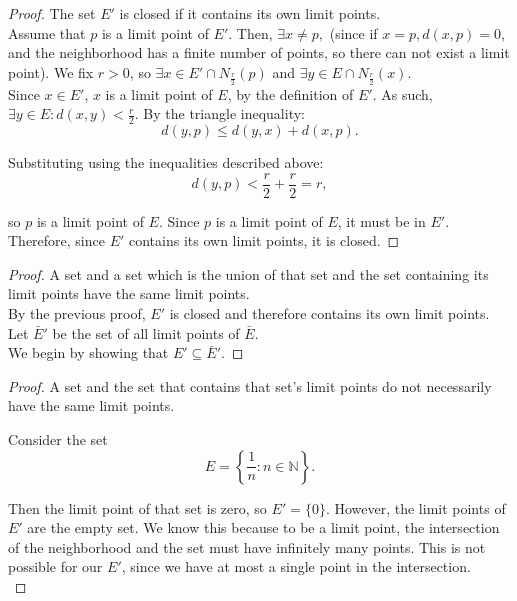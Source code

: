 \documentclass[10pt]{article}
\theoremstyle{definition}
\theoremstyle{plain}
\newcommand{\N}{\mathbb{N}}
\begin{document}
\begin{proof}
The set $E'$ is closed if it contains its own limit points. \\

Assume that $p$ is a limit point of $E'$. Then, $\exists x\neq p,$ (since if $x=p, d(x,p)=0$, and the neighborhood has a finite number of points, so there can not exist a limit point). We fix $r>0$, so $\exists x\in E'\cap N_{\frac{r}{2}}(p)$ and $\exists y\in E \cap N_{\frac{r}{2}}(x)$. \\

Since $x\in E'$, $x$ is a limit point of $E$, by the definition of $E'$. As such, $\exists y\in E: d(x,y) < \frac{r}{2}$. By the triangle inequality:
$$d(y,p) \leq d(y,x) + d(x,p).$$

Substituting using the inequalities described above:
$$d(y,p) < \frac{r}{2}+\frac{r}{2} =r,$$

so $p$ is a limit point of $E$. Since $p$ is a limit point of $E$, it must be in $E'$. Therefore, since $E'$ contains its own limit points, it is closed.
\end{proof}

\begin{proof}
A set and a set which is the union of that set and the set containing its limit points have the same limit points. \\

By the previous proof, $E'$ is closed and therefore contains its own limit points. \\

Let $\bar{E}'$ be the set of all limit points of $\bar{E}$. \\

We begin by showing that $E'\subseteq \bar{E}'$.

\end{proof}

\begin{proof}
  A set and the set that contains that set's limit points do not necessarily have the same limit points.

  Consider the set
  $$E = \left\{\frac{1}{n}: n\in\N\right\}.$$

  Then the limit point of that set is zero, so $E' = \{0\}$. However, the limit points of $E'$ are the empty set. We know this because to be a limit point, the intersection of the neighborhood and the set must have infinitely many points. This is not possible for our $E'$, since we have at most a single point in the intersection. \\
\end{proof}
\end{document}
